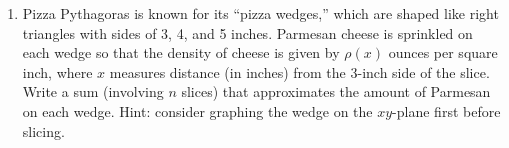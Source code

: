 \documentclass{article}
\begin{document}
\begin{enumerate}

\item 
\begin{problem}[\vfill\newpage]
Pizza Pythagoras is known for its ``pizza wedges,'' which are shaped
like right triangles with sides of 3, 4, and 5 inches.  Parmesan
cheese is sprinkled on each wedge so that the density of cheese is
given by $\rho(x)$ ounces per square inch, where $x$ measures distance
(in inches) from the 3-inch side of the slice. 
Write a sum
(involving $n$ slices) that approximates the amount of Parmesan on
each wedge. Hint: consider graphing the wedge on the $xy$-plane first before slicing.


\end{problem}
\end{enumerate}
\end{document}
